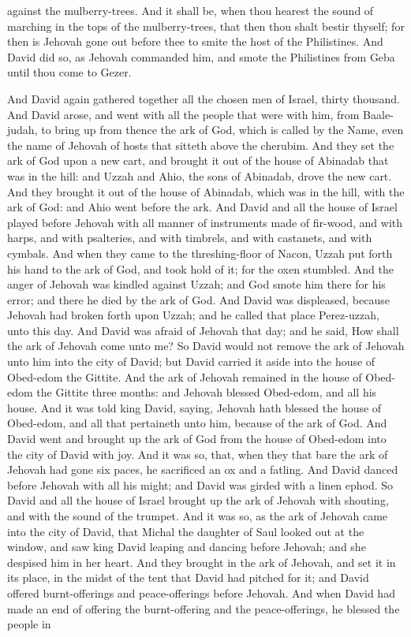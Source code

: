 against the mulberry-trees. And it shall be, when thou hearest the sound of marching in the tops of the mulberry-trees, that then thou shalt bestir thyself; for then is Jehovah gone out before thee to smite the host of the Philistines. And David did so, as Jehovah commanded him, and smote the Philistines from Geba until thou come to Gezer. 

And David again gathered together all the chosen men of Israel, thirty thousand. And David arose, and went with all the people that were with him, from Baale-judah, to bring up from thence the ark of God, which is called by the Name, even the name of Jehovah of hosts that sitteth above the cherubim. And they set the ark of God upon a new cart, and brought it out of the house of Abinadab that was in the hill: and Uzzah and Ahio, the sons of Abinadab, drove the new cart. And they brought it out of the house of Abinadab, which was in the hill, with the ark of God: and Ahio went before the ark. And David and all the house of Israel played before Jehovah with all manner of instruments made of fir-wood, and with harps, and with psalteries, and with timbrels, and with castanets, and with cymbals.  And when they came to the threshing-floor of Nacon, Uzzah put forth his hand to the ark of God, and took hold of it; for the oxen stumbled. And the anger of Jehovah was kindled against Uzzah; and God smote him there for his error; and there he died by the ark of God. And David was displeased, because Jehovah had broken forth upon Uzzah; and he called that place Perez-uzzah, unto this day. And David was afraid of Jehovah that day; and he said, How shall the ark of Jehovah come unto me? So David would not remove the ark of Jehovah unto him into the city of David; but David carried it aside into the house of Obed-edom the Gittite. And the ark of Jehovah remained in the house of Obed-edom the Gittite three months: and Jehovah blessed Obed-edom, and all his house.  And it was told king David, saying, Jehovah hath blessed the house of Obed-edom, and all that pertaineth unto him, because of the ark of God. And David went and brought up the ark of God from the house of Obed-edom into the city of David with joy. And it was so, that, when they that bare the ark of Jehovah had gone six paces, he sacrificed an ox and a fatling. And David danced before Jehovah with all his might; and David was girded with a linen ephod. So David and all the house of Israel brought up the ark of Jehovah with shouting, and with the sound of the trumpet.  And it was so, as the ark of Jehovah came into the city of David, that Michal the daughter of Saul looked out at the window, and saw king David leaping and dancing before Jehovah; and she despised him in her heart. And they brought in the ark of Jehovah, and set it in its place, in the midst of the tent that David had pitched for it; and David offered burnt-offerings and peace-offerings before Jehovah. And when David had made an end of offering the burnt-offering and the peace-offerings, he blessed the people in 